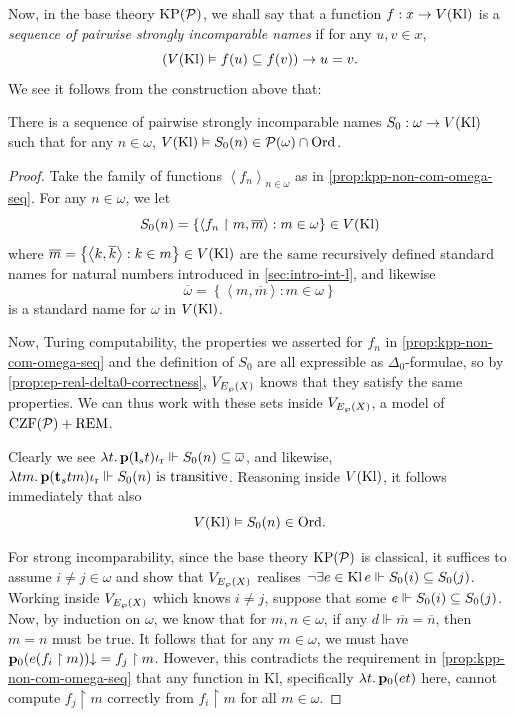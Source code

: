 \documentclass[12pt,openany]{book}
\theoremstyle{plain}
\theoremstyle{definition}
\newcommand\tuple[1]{\left\langle #1 \right\rangle}
\newcommand\opE[1]{\mathop{\exists #1}}
\newcommand\oplam[1]{\mathop{\lambda #1.}}
\newcommand\Pow{\mathcal{P}}
\newcommand\KPP{\mathrm{KP}\mleft(\Pow\mright)}
\newcommand\CZFP{\mathrm{CZF}\mleft(\Pow\mright)}
\newcommand\REM{\mathrm{REM}}
\newcommand\Ord{\mathrm{Ord}}
\newcommand\Kl{\mathrm{Kl}}
\newcommand\bp{\mathbf{p}}
\newcommand\bl{\mathbf{l}}
\newcommand\bt{\mathbf{t}}
\newcommand\ior{\iota_\textup{r}}
\begin{document}
Now, in the base theory $\KPP$, we shall say that a function $f : x \rightarrow V\mleft(\Kl\mright)$ is a \emph{sequence of pairwise strongly incomparable names} if for any $u, v \in x$,
\[\left(V\mleft(\Kl\mright) \vDash f\mleft(u\mright) \subseteq f\mleft(v\mright)\right) \rightarrow u = v.\]
We see it follows from the construction above that:
\begin{corollary}
  \label{cor:kpp-incom-omega-seq}
  There is a sequence of pairwise strongly incomparable names $S_0 : \omega \rightarrow V\mleft(\Kl\mright)$ such that for any $n \in \omega$, $V\mleft(\Kl\mright) \vDash S_0\mleft(n\mright) \in \Pow\mleft(\omega\mright) \cap \Ord$.
\end{corollary}

\begin{proof}
  Take the family of functions $\tuple{f_n}_{n \in \omega}$ as in \autoref{prop:kpp-non-com-omega-seq}. For any $n \in \omega$, we let
  \[S_0\mleft(n\mright) = \left\{\tuple{f_n \upharpoonright m, \overline{m}} : m \in \omega\right\} \in V\mleft(\Kl\mright)\]
  where $\overline{m} = \left\{\tuple{k, \overline{k}} : k \in m\right\} \in V\mleft(\Kl\mright)$ are the same recursively defined standard names for natural numbers introduced in \autoref{sec:intro-int-l}, and likewise
  \[\overline{\omega} = \left\{\tuple{m, \overline{m}} : m \in \omega\right\}\]
  is a standard name for $\omega$ in $V\mleft(\Kl\mright)$.

  Now, Turing computability, the properties we asserted for $f_n$ in \autoref{prop:kpp-non-com-omega-seq} and the definition of $S_0$ are all expressible as $\Delta_0$-formulae, so by \autoref{prop:ep-real-delta0-correctness}, $V_{E_\wp\mleft(X\mright)}$ knows that they satisfy the same properties. We can thus work with these sets inside $V_{E_\wp\mleft(X\mright)}$, a model of $\CZFP + \REM$.

  Clearly we see $\oplam{t} \bp \mleft(\bl_s t\mright) \ior \Vdash S_0\mleft(n\mright) \subseteq \overline{\omega}$, and likewise, $\oplam{tm} \bp \mleft(\bt_s tm\mright) \ior \Vdash \text{$S_0\mleft(n\mright)$ is transitive}$. Reasoning inside $V\mleft(\Kl\mright)$, it follows immediately that also
  \[V\mleft(\Kl\mright) \vDash S_0\mleft(n\mright) \in \Ord.\]

  For strong incomparability, since the base theory $\KPP$ is classical, it suffices to assume $i \neq j \in \omega$ and show that $V_{E_\wp\mleft(X\mright)}$ realises $\neg\!\opE{e \in \Kl} e \Vdash S_0\mleft(i\mright) \subseteq S_0\mleft(j\mright)$. Working inside $V_{E_\wp\mleft(X\mright)}$ which knows $i \neq j$, suppose that some $e \Vdash S_0\mleft(i\mright) \subseteq S_0\mleft(j\mright)$. Now, by induction on $\omega$, we know that for $m, n \in \omega$, if any $d \Vdash \overline{m} = \overline{n}$, then $m = n$ must be true. It follows that for any $m \in \omega$, we must have $\bp_0 \mleft(e \mleft(f_i \upharpoonright m\mright)\mright) {\downarrow} = f_j \upharpoonright m$. However, this contradicts the requirement in \autoref{prop:kpp-non-com-omega-seq} that any function in $\Kl$, specifically $\oplam{t} \bp_0 \mleft(et\mright)$ here, cannot compute $f_j \upharpoonright m$ correctly from $f_i \upharpoonright m$ for all $m \in \omega$.
\end{proof}
\end{document}
